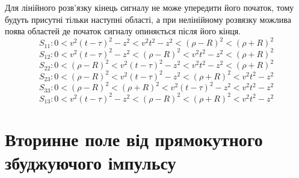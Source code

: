 %
Для лінійного розв'язку кінець сигналу не може упередити його початок, 
тому будуть присутні тільки наступні області, а при нелінійному розвязку 
можлива поява областей де початок сигналу опиняється після його кінця.
%
\begin{equation*}
S_{11}: 0 < v^2 (t-\tau)^2 - z^2 < v^2 t^2 - z^2 < 
\left( \rho - R \right)^2 < \left( \rho + R \right)^2
\end{equation*}
%
\begin{equation*}
S_{12}: 0 < v^2 (t-\tau)^2 - z^2 < \left( \rho - R \right)^2 < 
v^2 t^2 - z^2 < \left( \rho + R \right)^2
\end{equation*}
%
\begin{equation*}
S_{22}: 0 < \left( \rho - R \right)^2 < v^2 (t-\tau)^2 - z^2 < 
v^2 t^2 - z^2 < \left( \rho + R \right)^2
\end{equation*}
%
\begin{equation*}
S_{23}: 0 < \left( \rho - R \right)^2 < v^2 (t-\tau)^2 - z^2 < 
\left( \rho + R \right)^2 < v^2 t^2 - z^2 
\end{equation*}
%
\begin{equation*}
S_{33}: 0 < \left( \rho - R \right)^2 < \left( \rho + R \right)^2 <
v^2 (t-\tau)^2 - z^2 < v^2 t^2 - z^2
\end{equation*}
%
\begin{equation*}
S_{13}: 0 < v^2 (t-\tau)^2 - z^2 < \left( \rho - R \right)^2 < 
\left( \rho + R \right)^2 < v^2 t^2 - z^2
\end{equation*}

\section{Вторинне поле від прямокутного збуджуючого імпульсу}


